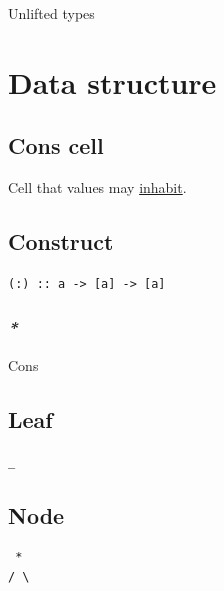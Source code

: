 \documentclass[a4paper,14pt,oneside]{book}
\begin{document}
\label{org5070666}Unlifted types\\

\section{\label{orgc195a61}Data structure}
\label{sec:org0e40b0d}
\subsection{\label{org596fa0b}Cons cell}
\label{sec:org3a47365}
Cell that values may \hyperref[org9e8ed00]{inhabit}.\\

\subsection{\label{org3de2950}Construct}
\label{sec:org8fc6f46}
\begin{verbatim}
(:) :: a -> [a] -> [a]
\end{verbatim}

\subsubsection{\emph{*}}
\label{sec:orgd783c73}

\label{org9fda5d7}Cons\\

\subsection{\label{orgc4e7407}Leaf}
\label{sec:org69fcc3f}
\begin{verbatim}
_
\end{verbatim}

\subsection{\label{orge526029}Node}
\label{sec:org3996300}
\begin{verbatim}
 *
/ \
\end{verbatim}
\end{document}
